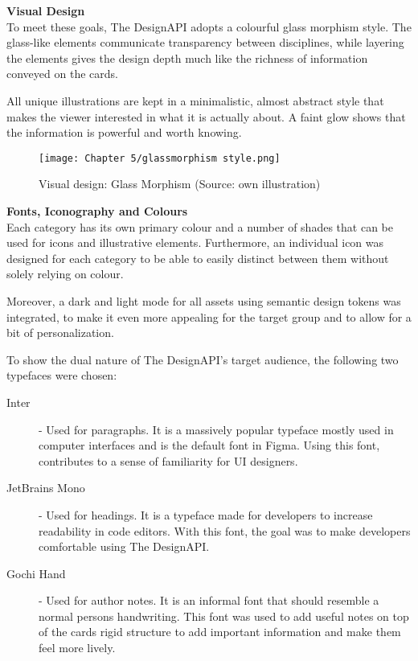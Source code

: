 \textbf{Visual Design}\\
To meet these goals, The DesignAPI adopts a colourful glass morphism style. The glass-like elements
communicate transparency between disciplines, while layering the elements gives the design depth
much like the richness of information conveyed on the cards.

All unique illustrations are kept in a minimalistic, almost abstract style that makes the viewer
interested in what it is actually about. A faint glow shows that the information is powerful and
worth knowing.

\begin{figure}[H]
      \centering
      \texttt{[image: Chapter 5/glassmorphism style.png]}
      \caption{Visual design: Glass Morphism (Source: own illustration)}
\end{figure}

\textbf{Fonts, Iconography and Colours}\\
Each category has its own primary colour and a number of shades that can be used for icons and
illustrative elements. Furthermore, an individual icon was designed for each category to be able to
easily distinct between them without solely relying on colour.

Moreover, a dark and light mode for all assets using semantic design tokens was integrated, to
make it even more appealing for the target group and to allow for a bit of personalization.

To show the dual nature of The DesignAPI's target audience, the following two typefaces were chosen:
\begin{description}
      \item[Inter] - Used for paragraphs. It is a massively popular typeface mostly used in
            computer interfaces and is the default font in Figma. Using this font, contributes to a
            sense of familiarity for UI designers. 

      \item[JetBrains Mono] - Used for headings. It is a typeface made for developers to increase
            readability in code editors. With this font, the goal was to make developers comfortable
            using The DesignAPI. 

      \item[Gochi Hand] - Used for author notes. It is an informal font that should resemble a normal
            persons handwriting. This font was used to add useful notes on top of the cards rigid structure
            to add important information and make them feel more lively.
\end{description}

